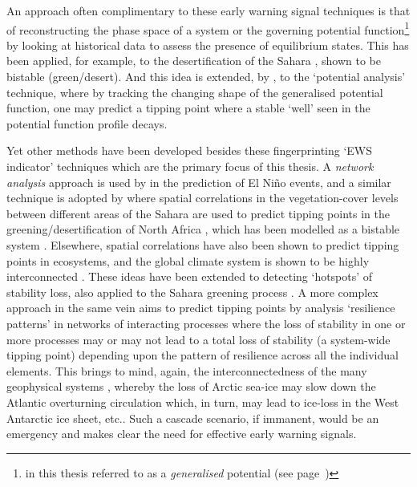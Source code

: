{{%
An approach often complimentary to these early warning signal techniques is that of reconstructing the phase space of a system \citep{cimatoribus2013dansgaard} or the governing potential function\footnote{in this thesis referred to as a \emph{generalised} potential (see page~\pageref{pageref:intro:generalisedpotential})} \citep{livina2011} by looking at historical data to assess the presence of equilibrium states. This has been applied, for example, to the desertification of the Sahara \citep{bathiany2012implications}, shown to be bistable (green/desert). And this idea is extended, by \cite{livina2010, livina2011}, to the `potential analysis' technique, where by tracking the changing shape of the generalised potential function, one may predict a tipping point where a stable `well' seen in the potential function profile decays.

Yet other methods have been developed besides these fingerprinting `EWS indicator' techniques which are the primary focus of this thesis. A \emph{network analysis} approach is used by \cite{ludescher2013,ludescher2014} in the prediction of El Ni\~{n}o events, and a similar technique is adopted by \cite{scheffer2009} where spatial correlations in the vegetation-cover levels between different areas of the Sahara are used to predict tipping points in the greening/desertification of North Africa \citep{kefi2014early}, which has been modelled as a bistable system \citep{brovkin1998stability}. Elsewhere, spatial correlations have also been shown to predict tipping points in ecosystems, and the global climate system is shown to be highly interconnected \citep{palus2011discerning}. These ideas have been extended to detecting `hotspots' of stability loss, also applied to the Sahara greening process \citep{bathiany2013p1,bathiany2013p2}. A more complex approach in the same vein aims to predict tipping points by analysis `resilience patterns' in networks of interacting processes \citep{gao2016} where the loss of stability in one or more processes may or may not lead to a total loss of stability (a system-wide tipping point) depending upon the pattern of resilience across all the individual elements. This brings to mind, again, the interconnectedness of the many geophysical systems \citep{steffen2018trajectories,lenton2019climate}, whereby the loss of Arctic sea-ice may slow down the Atlantic overturning circulation which, in turn, may lead to ice-loss in the West Antarctic ice sheet, etc.. Such a cascade scenario, if immanent, would be an emergency and makes clear the need for effective early warning signals. 
}}

